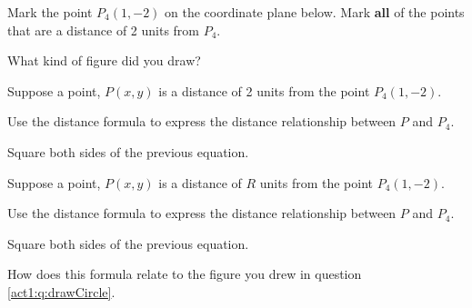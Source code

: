 \begin{problem}
  \vfill


\clearpage

\item Mark the point $P_4(1,-2)$ on the coordinate plane below. Mark \textbf{all}
  of the points that are a distance of 2 units from $P_4$.
  \label{act1:q:drawCircle}


  \vfill

  What kind of figure did you draw?

  \vfill

\clearpage

\item Suppose a point, $P(x,y)$ is a distance of 2 units from the
  point $P_4(1,-2)$.
  \begin{subproblem}
  \item Use the distance formula to express the distance relationship
    between $P$ and $P_4$.
    \vfill
  \item Square both sides of the previous equation.
    \vfill
  \end{subproblem}

\item Suppose a point, $P(x,y)$ is a distance of $R$ units from the
  point $P_4(1,-2)$.
  \begin{subproblem}
  \item Use the distance formula to express the distance relationship
    between $P$ and $P_4$.
    \vfill
  \item Square both sides of the previous equation.
    \vfill

  \item How does this formula relate to the figure you drew in
    question \ref{act1:q:drawCircle}.
  \end{subproblem}

\end{problem}


